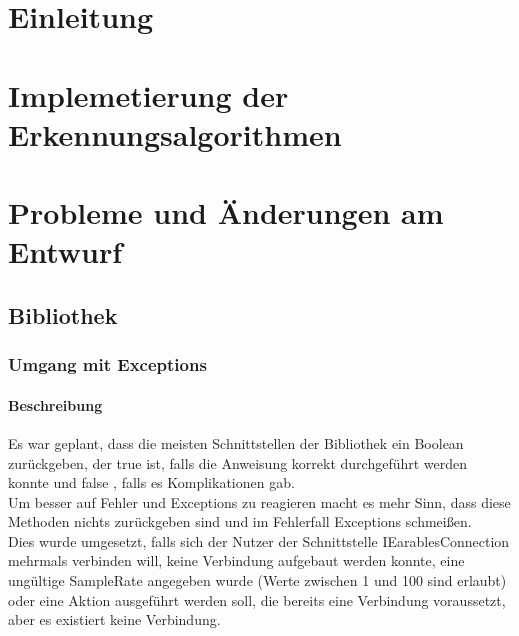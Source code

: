 \documentclass[a4paper,12pt]{article}
\title{\projektName}
\date{\today}
\author{Tec O'Brain}
\begin{document}
\setcounter{page}{2}
\tableofcontents          %
\clearpage
{}

\section{Einleitung}



\section{Implemetierung der Erkennungsalgorithmen}
\label{algorithmen}
\section{Probleme und Änderungen am Entwurf}
\subsection{Bibliothek}

\subsubsection{Umgang mit Exceptions}
\paragraph{Beschreibung}
Es war geplant, dass die meisten Schnittstellen der Bibliothek ein Boolean zurückgeben, der true ist, falls die Anweisung korrekt durchgeführt werden konnte und false , falls es Komplikationen gab.\\
Um besser auf Fehler und Exceptions zu reagieren macht es mehr Sinn, dass diese Methoden nichts zurückgeben sind und im Fehlerfall Exceptions schmeißen.\\
Dies wurde umgesetzt, falls sich der Nutzer der Schnittstelle IEarablesConnection mehrmals verbinden will, keine Verbindung aufgebaut werden konnte, eine ungültige SampleRate angegeben wurde (Werte zwischen 1 und 100 sind erlaubt) oder eine Aktion ausgeführt werden soll, die bereits eine Verbindung voraussetzt, aber es existiert keine Verbindung.
\end{document}

